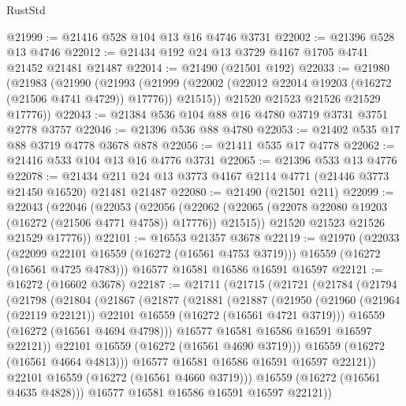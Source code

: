 \begin{lexlean}{RustStd}
\begin{coremodule}
@21999 := @21416 @528 @104 @13 @16 @4746 @3731
@22002 := @21396 @528 @13 @4746
@22012 := @21434 @192 @24 @13 @3729 @4167 @1705 @4741 @21452 @21481 @21487
@22014 := @21490 (@21501 @192)
@22033 := @21980
    (@21983
      (@21990
        (@21993
          (@21999 (@22002 (@22012 @22014 @19203 (@16272 (@21506 @4741 @4729)) @17776)) @21515))
        @21520
        @21523
        @21526
        @21529
        @17776))
@22043 := @21384 @536 @104 @88 @16 @4780 @3719 @3731 @3751 @2778 @3757
@22046 := @21396 @536 @88 @4780
@22053 := @21402 @535 @17 @88 @3719 @4778 @3678 @878
@22056 := @21411 @535 @17 @4778
@22062 := @21416 @533 @104 @13 @16 @4776 @3731
@22065 := @21396 @533 @13 @4776
@22078 := @21434 @211 @24 @13 @3773 @4167 @2114 @4771 (@21446 @3773 @21450 @16520) @21481 @21487
@22080 := @21490 (@21501 @211)
@22099 := @22043
    (@22046
      (@22053
        (@22056
          (@22062 (@22065 (@22078 @22080 @19203 (@16272 (@21506 @4771 @4758)) @17776)) @21515))
        @21520
        @21523
        @21526
        @21529
        @17776))
@22101 := @16553 @21357 @3678
@22119 := @21970
    (@22033
      (@22099 @22101 @16559 (@16272 (@16561 @4753 @3719)))
      @16559
      (@16272 (@16561 @4725 @4783)))
    @16577
    @16581
    @16586
    @16591
    @16597
@22121 := @16272 (@16602 @3678)
@22187 := @21711
    (@21715
      (@21721
        (@21784
          (@21794
            (@21798
              (@21804
                (@21867
                  (@21877
                    (@21881
                      (@21887
                        (@21950
                          (@21960
                            (@21964 (@22119 @22121))
                            @22101
                            @16559
                            (@16272 (@16561 @4721 @3719)))
                          @16559
                          (@16272 (@16561 @4694 @4798)))
                        @16577
                        @16581
                        @16586
                        @16591
                        @16597
                        @22121))
                    @22101
                    @16559
                    (@16272 (@16561 @4690 @3719)))
                  @16559
                  (@16272 (@16561 @4664 @4813)))
                @16577
                @16581
                @16586
                @16591
                @16597
                @22121))
            @22101
            @16559
            (@16272 (@16561 @4660 @3719)))
          @16559
          (@16272 (@16561 @4635 @4828)))
        @16577
        @16581
        @16586
        @16591
        @16597
        @22121))

\end{coremodule}
\end{lexlean}
